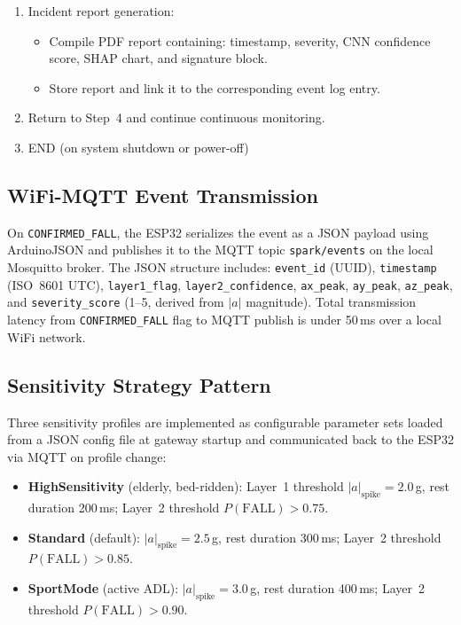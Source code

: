 \begin{enumerate}
    \item Incident report generation:
    \begin{itemize}
        \item Compile PDF report containing: timestamp, severity, CNN confidence score, SHAP chart, and signature block.
        \item Store report and link it to the corresponding event log entry.
    \end{itemize}

    \item Return to Step~4 and continue continuous monitoring.

    \item END (on system shutdown or power-off)

\end{enumerate}



\subsection{WiFi-MQTT Event Transmission}
\label{sec:mqtt_transmission}

On \texttt{CONFIRMED\_FALL}, the ESP32 serializes the event as a JSON payload using ArduinoJSON and publishes it to the MQTT topic \texttt{spark/events} on the local Mosquitto broker. The JSON structure includes: \texttt{event\_id} (UUID), \texttt{timestamp} (ISO~8601 UTC), \texttt{layer1\_flag}, \texttt{layer2\_confidence}, \texttt{ax\_peak}, \texttt{ay\_peak}, \texttt{az\_peak}, and \texttt{severity\_score} (1--5, derived from $|a|$ magnitude). Total transmission latency from \texttt{CONFIRMED\_FALL} flag to MQTT publish is under 50\,ms over a local WiFi network.

\subsection{Sensitivity Strategy Pattern}
\label{sec:strategy}

Three sensitivity profiles are implemented as configurable parameter sets loaded from a JSON config file at gateway startup and communicated back to the ESP32 via MQTT on profile change:

\begin{itemize}
	\item \textbf{HighSensitivity} (elderly, bed-ridden): Layer~1 threshold $|a|_{\text{spike}} = 2.0$\,g, rest duration 200\,ms; Layer~2 threshold $P(\text{FALL}) > 0.75$.
	\item \textbf{Standard} (default): $|a|_{\text{spike}} = 2.5$\,g, rest duration 300\,ms; Layer~2 threshold $P(\text{FALL}) > 0.85$.
	\item \textbf{SportMode} (active ADL): $|a|_{\text{spike}} = 3.0$\,g, rest duration 400\,ms; Layer~2 threshold $P(\text{FALL}) > 0.90$.
\end{itemize}

